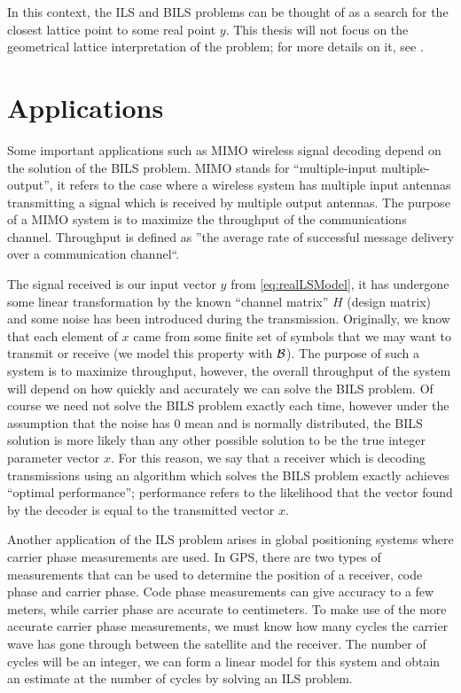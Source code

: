 \documentclass[12pt,Bold,letterpaper]{mcgilletdclass}
\newcommand{\boxcon}{{\cal B}}
\newcommand{\vsp}{\vspace{\baselineskip}}
\begin{document}
In this context, the ILS and BILS problems can be thought of as a search for the closest lattice point to some real point $y$. This thesis will not focus on the geometrical lattice interpretation of the problem; for more details on it, see \cite{AgrEVZ02}.

\vsp \section{Applications}

Some important applications such as MIMO wireless signal decoding depend on the
solution of the BILS problem. MIMO stands for ``multiple-input
multiple-output'', it refers to the case where a wireless system has multiple
input antennas transmitting a signal which is received by multiple output
antennas. The purpose of a MIMO system is to maximize the throughput of the communications channel. Throughput is defined as ''the average rate of successful message delivery over a communication channel``. 

The signal received is our input vector $y$ from
\eqref{eq:realLSModel}, it has undergone some linear transformation by the known
``channel matrix'' $H$ (design matrix) and some noise has been introduced during
the transmission. Originally, we know that each element of $x$ came from some
finite set of symbols that we may want to transmit or receive (we model
this property with $\boxcon$). The purpose of such a system is to maximize
throughput, however, the overall throughput of the system will depend on how
quickly and accurately we can solve the BILS problem. Of course we need not solve the BILS
problem exactly each time, however under the assumption that the noise has $0$ mean and is
normally distributed, the BILS solution is more likely than any other possible
solution to be the true integer parameter vector $x$. For this reason, we say that a receiver which is decoding transmissions using an algorithm which solves the BILS problem exactly achieves ``optimal performance''; performance refers to the likelihood that the vector found by the decoder is equal to the transmitted vector $x$.

Another application of the ILS problem arises in global positioning systems where carrier phase measurements are used. In GPS, there are two types of measurements that can be used to determine the position of a receiver, code phase and carrier phase. Code phase measurements can give accuracy to a few meters, while carrier phase are accurate to centimeters. To make use of the more accurate carrier phase measurements, we must know how many cycles the carrier wave has gone through between the satellite and the receiver. The number of cycles will be an integer, we can form a linear model for this system and obtain an estimate at the number of cycles by solving an ILS problem. 
\end{document}
